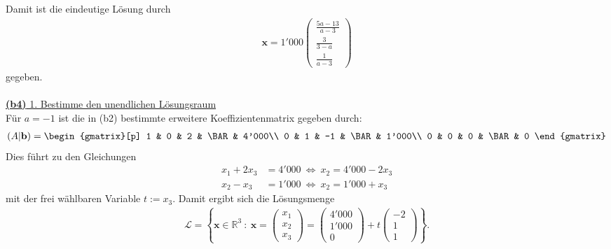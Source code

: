 Damit ist die eindeutige Lösung durch
\begin{align*}
	\mathbf{x}
	=
	1'000 
	\begin{pmatrix}
		 \frac{5a -13}{a-3}\\
		\frac{3}{3-a}\\
		\frac{1}{a-3}
	\end{pmatrix}
\end{align*}
gegeben.\\
\\
\underline{\textbf{(b4)} 1. Bestimme den unendlichen Lösungsraum}\\
Für $ a = -1 $ ist die in (b2) bestimmte erweitere Koeffizientenmatrix gegeben durch:
\begin{align*}
	(A | \mathbf{b}) 
	= 
	\begin{gmatrix}[p]
		1 & 0 & 2 & \BAR & 4'000\\
		0 & 1 & -1 & \BAR & 1'000\\
		0 & 0 & 0  & \BAR & 0
	\end{gmatrix}
\end{align*}
Dies führt zu den Gleichungen
\begin{align*}
	x_1 + 2 x_3 &= 4'000
	\ \Leftrightarrow \ x_2 = 4'000 - 2 x_3
	\\
	x_2 - x_3 &= 1'000
	\ \Leftrightarrow \
	x_2 = 1'000 + x_3
\end{align*}
mit der frei wählbaren Variable $ t:=x_3 $. Damit ergibt sich die Lösungsmenge
\begin{align*}
	\mathcal{L}
	= \left\lbrace
	\mathbf{x} \in \mathbb{R}^3 \ : \
	\mathbf{x} = 
	\begin{pmatrix}
		x_1 \\ x_2 \\ x_3
	\end{pmatrix} 
	=
	\begin{pmatrix}
		4'000\\
		1'000\\
		0
	\end{pmatrix}
	+ t 
	\begin{pmatrix}
		-2\\
		1 \\
		1
	\end{pmatrix}
	\right\rbrace.
\end{align*}
